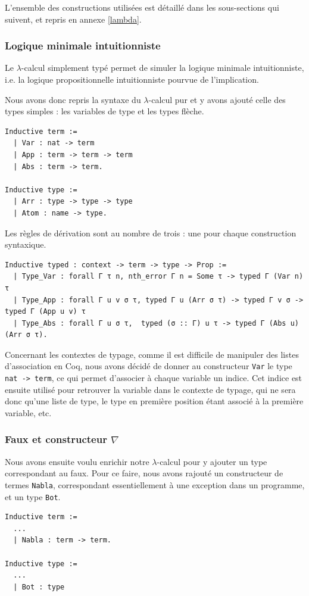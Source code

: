 \documentclass[a4paper]{article}
\begin{document}
L'ensemble des constructions utilisées est détaillé dans les sous-sections qui suivent, et repris en annexe \ref{lambda}.

\subsubsection{Logique minimale intuitionniste}

Le $\lambda$-calcul simplement typé permet de simuler la logique minimale intuitionniste, i.e. la logique propositionnelle intuitionniste pourvue de l'implication.

Nous avons donc repris la syntaxe du $\lambda$-calcul pur et y avons ajouté celle des types simples : les variables de type et les types flèche.
\begin{verbatim}
Inductive term :=
  | Var : nat -> term
  | App : term -> term -> term
  | Abs : term -> term.
  
Inductive type :=
  | Arr : type -> type -> type
  | Atom : name -> type.
\end{verbatim}

Les règles de dérivation sont au nombre de trois : une pour chaque construction syntaxique.
\begin{verbatim}
Inductive typed : context -> term -> type -> Prop :=
  | Type_Var : forall Γ τ n, nth_error Γ n = Some τ -> typed Γ (Var n) τ
  | Type_App : forall Γ u v σ τ, typed Γ u (Arr σ τ) -> typed Γ v σ -> typed Γ (App u v) τ
  | Type_Abs : forall Γ u σ τ,  typed (σ :: Γ) u τ -> typed Γ (Abs u) (Arr σ τ).
\end{verbatim}

Concernant les contextes de typage, comme il est difficile de manipuler des listes d'association en Coq, nous avons décidé de donner au constructeur \verb+Var+ le type \verb+nat -> term+, ce qui permet d'associer à chaque variable un indice. Cet indice est ensuite utilisé pour retrouver la variable dans le contexte de typage, qui ne sera donc qu'une liste de type, le type en première position étant associé à la première variable, etc.

\subsubsection{Faux et constructeur $\nabla$}

Nous avons ensuite voulu enrichir notre $\lambda$-calcul pour y ajouter un type correspondant au faux. Pour ce faire, nous avons rajouté un constructeur de termes \verb+Nabla+, correspondant essentiellement à une exception dans un programme, et un type \verb+Bot+.
\begin{verbatim}
Inductive term :=
  ...
  | Nabla : term -> term.
  
Inductive type :=
  ...
  | Bot : type
\end{verbatim}
\end{document}
